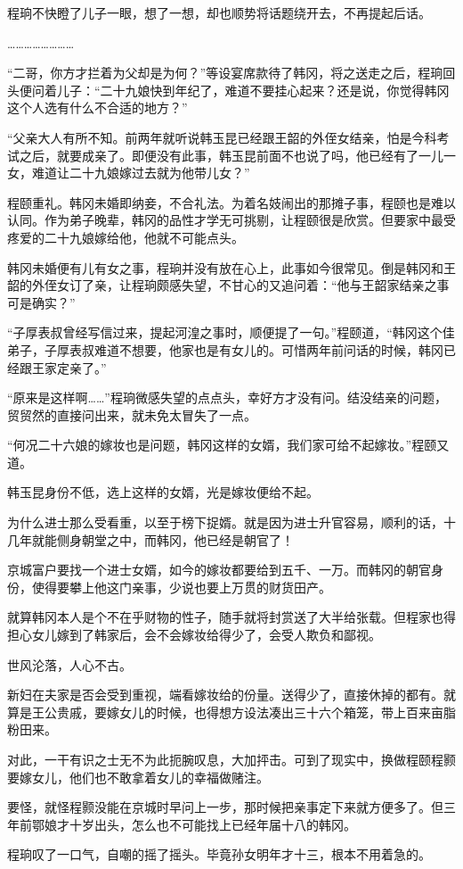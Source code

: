 程珦不快瞪了儿子一眼，想了一想，却也顺势将话题绕开去，不再提起后话。

……………………

“二哥，你方才拦着为父却是为何？”等设宴席款待了韩冈，将之送走之后，程珦回头便问着儿子：“二十九娘快到年纪了，难道不要挂心起来？还是说，你觉得韩冈这个人选有什么不合适的地方？”

“父亲大人有所不知。前两年就听说韩玉昆已经跟王韶的外侄女结亲，怕是今科考试之后，就要成亲了。即便没有此事，韩玉昆前面不也说了吗，他已经有了一儿一女，难道让二十九娘嫁过去就为他带儿女？”

程颐重礼。韩冈未婚即纳妾，不合礼法。为着名妓闹出的那摊子事，程颐也是难以认同。作为弟子晚辈，韩冈的品性才学无可挑剔，让程颐很是欣赏。但要家中最受疼爱的二十九娘嫁给他，他就不可能点头。

韩冈未婚便有儿有女之事，程珦并没有放在心上，此事如今很常见。倒是韩冈和王韶的外侄女订了亲，让程珦颇感失望，不甘心的又追问着：“他与王韶家结亲之事可是确实？”

“子厚表叔曾经写信过来，提起河湟之事时，顺便提了一句。”程颐道，“韩冈这个佳弟子，子厚表叔难道不想要，他家也是有女儿的。可惜两年前问话的时候，韩冈已经跟王家定亲了。”

“原来是这样啊……”程珦微感失望的点点头，幸好方才没有问。结没结亲的问题，贸贸然的直接问出来，就未免太冒失了一点。

“何况二十六娘的嫁妆也是问题，韩冈这样的女婿，我们家可给不起嫁妆。”程颐又道。

韩玉昆身份不低，选上这样的女婿，光是嫁妆便给不起。

为什么进士那么受看重，以至于榜下捉婿。就是因为进士升官容易，顺利的话，十几年就能侧身朝堂之中，而韩冈，他已经是朝官了！

京城富户要找一个进士女婿，如今的嫁妆都要给到五千、一万。而韩冈的朝官身份，使得要攀上他这门亲事，少说也要上万贯的财货田产。

就算韩冈本人是个不在乎财物的性子，随手就将封赏送了大半给张载。但程家也得担心女儿嫁到了韩家后，会不会嫁妆给得少了，会受人欺负和鄙视。

世风沦落，人心不古。

新妇在夫家是否会受到重视，端看嫁妆给的份量。送得少了，直接休掉的都有。就算是王公贵戚，要嫁女儿的时候，也得想方设法凑出三十六个箱笼，带上百来亩脂粉田来。

对此，一干有识之士无不为此扼腕叹息，大加抨击。可到了现实中，换做程颐程颢要嫁女儿，他们也不敢拿着女儿的幸福做赌注。

要怪，就怪程颢没能在京城时早问上一步，那时候把亲事定下来就方便多了。但三年前鄂娘才十岁出头，怎么也不可能找上已经年届十八的韩冈。

程珦叹了一口气，自嘲的摇了摇头。毕竟孙女明年才十三，根本不用着急的。

